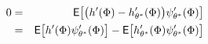\begin{equation}
\begin{aligned}
	0 & = & \Expect \bigl[\bigl(h'(\markovstate) - h'_{\param^*} (\markovstate)\bigr) \basis'_{\param^*} (\markovstate)\bigr]\\
	& = &  \Expect \bigl[ h'(\markovstate)\basis'_{\param^*} (\markovstate) \bigr] - \Expect \bigl[ h'_{\param^*} (\markovstate)\basis'_{\param^*} (\markovstate) \bigr]
\label{e:diff_td_gradTD_nl}
\end{aligned}
\end{equation}

